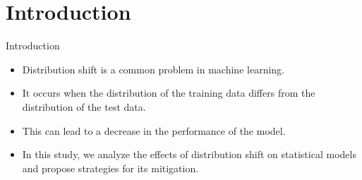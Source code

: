 \section[Introduction]{Introduction}

\begin{frame}{Introduction}
  \begin{itemize}
    \item Distribution shift is a common problem in machine learning.
    \item It occurs when the distribution of the training data differs from the distribution of the test data.
    \item This can lead to a decrease in the performance of the model.
    \item In this study, we analyze the effects of distribution shift on statistical models and propose strategies for its mitigation.
  \end{itemize}
\end{frame}
